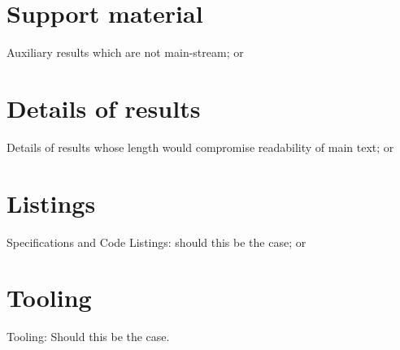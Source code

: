 \documentclass[
  oneside,
  11pt, a4paper,
  footinclude=true,
  headinclude=true,
  cleardoublepage=empty
]{scrbook}
\begin{document}


  

  \printindex


    \chapter{Support material}
      Auxiliary results which are not main-stream; or

    \chapter{Details of results}
      Details of results whose length would compromise readability of main text; or

    \chapter{Listings}
      Specifications and Code Listings: should this be the case; or

    \chapter{Tooling}
      Tooling: Should this be the case.


\end{document}
